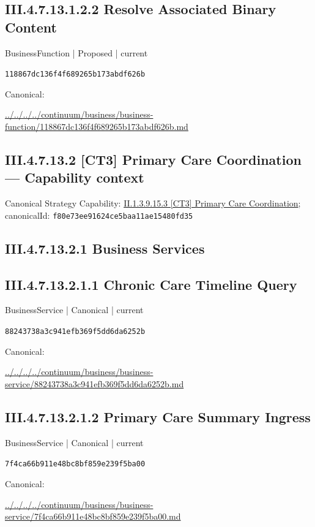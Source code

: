 \documentclass[10pt,a4paper]{article}
\begin{document}
\subsection*{III.4.7.13.1.2.2 Resolve Associated Binary Content}
\label{element-118867dc136f4f689265b173abdf626b}
{\small BusinessFunction | Proposed | current}\par
\texttt{118867dc136f4f689265b173abdf626b}\par
Canonical: \par
{\footnotesize\url{../../../../continuum/business/business-function/118867dc136f4f689265b173abdf626b.md}}\par
\subsection*{III.4.7.13.2 [CT3] Primary Care Coordination — Capability context}
Canonical Strategy Capability: \hyperref[element-f80e73ee91624ce5baa11ae15480fd35]{II.1.3.9.15.3 [CT3] Primary Care Coordination}; canonicalId: \texttt{f80e73ee91624ce5baa11ae15480fd35}\par
\subsection*{III.4.7.13.2.1 Business Services}
\subsection*{III.4.7.13.2.1.1 Chronic Care Timeline Query}
\label{element-88243738a3c941efb369f5dd6da6252b}
{\small BusinessService | Canonical | current}\par
\texttt{88243738a3c941efb369f5dd6da6252b}\par
Canonical: \par
{\footnotesize\url{../../../../continuum/business/business-service/88243738a3c941efb369f5dd6da6252b.md}}\par
\subsection*{III.4.7.13.2.1.2 Primary Care Summary Ingress}
\label{element-7f4ca66b911e48bc8bf859e239f5ba00}
{\small BusinessService | Canonical | current}\par
\texttt{7f4ca66b911e48bc8bf859e239f5ba00}\par
Canonical: \par
{\footnotesize\url{../../../../continuum/business/business-service/7f4ca66b911e48bc8bf859e239f5ba00.md}}\par
\end{document}
